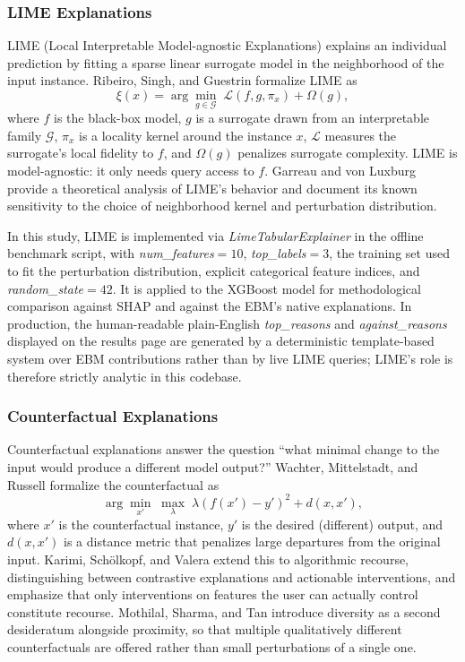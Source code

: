 \documentclass{icsthesis}
\begin{document}
\begin{mainmatter}
				\subsubsection{LIME Explanations}
					LIME (Local Interpretable Model-agnostic Explanations) explains an individual prediction by fitting a sparse linear surrogate model in the neighborhood of the input instance. Ribeiro, Singh, and Guestrin \cite{ref19} formalize LIME as
					\begin{equation*}
					    \xi(x) = \arg\min_{g \in \mathcal{G}}\; \mathcal{L}(f, g, \pi_x) + \Omega(g),
					\end{equation*}
					where $f$ is the black-box model, $g$ is a surrogate drawn from an interpretable family $\mathcal{G}$, $\pi_x$ is a locality kernel around the instance $x$, $\mathcal{L}$ measures the surrogate's local fidelity to $f$, and $\Omega(g)$ penalizes surrogate complexity. LIME is model-agnostic: it only needs query access to $f$. Garreau and von Luxburg \cite{ref71} provide a theoretical analysis of LIME's behavior and document its known sensitivity to the choice of neighborhood kernel and perturbation distribution.

					In this study, LIME is implemented via \emph{LimeTabularExplainer} in the offline benchmark script, with \emph{num\_features}$=10$, \emph{top\_labels}$=3$, the training set used to fit the perturbation distribution, explicit categorical feature indices, and \emph{random\_state}$=42$. It is applied to the XGBoost model for methodological comparison against SHAP and against the EBM's native explanations. In production, the human-readable plain-English \emph{top\_reasons} and \emph{against\_reasons} displayed on the results page are generated by a deterministic template-based system over EBM contributions rather than by live LIME queries; LIME's role is therefore strictly analytic in this codebase.

				\subsubsection{Counterfactual Explanations}
					Counterfactual explanations answer the question ``what minimal change to the input would produce a different model output?'' Wachter, Mittelstadt, and Russell \cite{ref20} formalize the counterfactual as
					\begin{equation*}
					    \arg\min_{x'}\;\max_\lambda\; \lambda (f(x') - y')^2 + d(x, x'),
					\end{equation*}
					where $x'$ is the counterfactual instance, $y'$ is the desired (different) output, and $d(x, x')$ is a distance metric that penalizes large departures from the original input. Karimi, Sch\"olkopf, and Valera \cite{ref72} extend this to algorithmic recourse, distinguishing between contrastive explanations and actionable interventions, and emphasize that only interventions on features the user can actually control constitute recourse. Mothilal, Sharma, and Tan \cite{ref73} introduce diversity as a second desideratum alongside proximity, so that multiple qualitatively different counterfactuals are offered rather than small perturbations of a single one.


\end{mainmatter}
\end{document}
